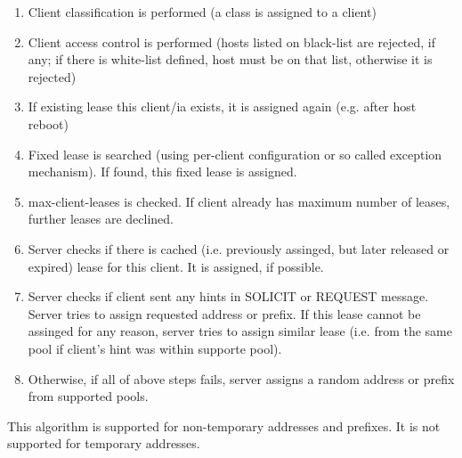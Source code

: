 \begin{enumerate}
\item Client classification is performed (a class is assigned to a client)
\item Client access control is performed (hosts listed on black-list are rejected,
  if any; if there is white-list defined, host must be on that list,
  otherwise it is rejected)
\item If existing lease this client/ia exists, it is assigned again
  (e.g. after host reboot)
\item Fixed lease is searched (using per-client configuration or so
  called exception mechanism). If found, this fixed lease is assigned.
\item max-client-leases is checked. If client already has maximum
  number of leases, further leases are declined.
\item Server checks if there is cached (i.e. previously assinged, but
  later released or expired) lease for this client. It is assigned, if
  possible.
\item Server checks if client sent any hints in SOLICIT or REQUEST
  message. Server tries to assign requested address or prefix. If this lease cannot be
  assinged for any reason, server tries to assign similar lease
  (i.e. from the same pool if client's hint was within supporte
  pool).
\item Otherwise, if all of above steps fails, server assigns a random
  address or prefix from supported pools.
\end{enumerate}

This algorithm is supported for non-temporary addresses and
prefixes. It is not supported for temporary addresses.


